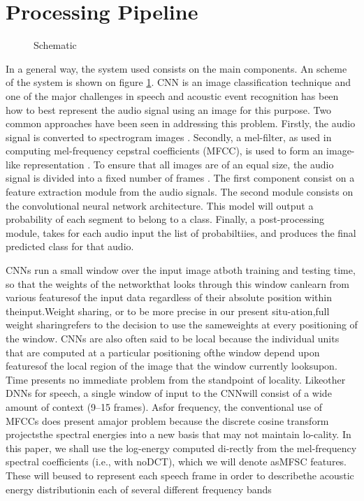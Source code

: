 
\section{Processing Pipeline}
\label{sec:processing_architecture}
\begin{figure}
\caption{Schematic}
\label{system_scheme}
\end{figure}

In a general way, the system used consists on the main components. An scheme of the system is shown on figure \ref{system_scheme}.  CNN is an image classification technique and one of the major challenges in speech and acoustic event recognition has been how to best represent the audio signal using an image for this purpose. Two common approaches have been seen in addressing this problem. Firstly, the audio signal is converted to spectrogram images \cite{zhang2015robust}. Secondly, a mel-filter, as used in computing mel-frequency cepstral coefficients (MFCC), is used to form an image-like representation \cite{abdel2014convolutional]}.  To ensure that all images are of an equal size, the audio signal is divided into a fixed number of frames \cite{We refer this as the mel-spectrogram.}. The first component consist on a feature extraction module  from the audio signals. The second module consists on the convolutional neural network architecture. This model will output a probability of each segment to belong to a class. Finally, a post-processing module, takes for each audio input the list of probabiltiies, and produces the final predicted class for that audio.

 



CNNs run a small window over the input image atboth training and testing time, so that the weights of the networkthat looks through this window canlearn from various featuresof the input data regardless of their absolute position within theinput.Weight sharing, or to be more precise in our present situ-ation,full weight sharingrefers to the decision to use the sameweights at every positioning of the window. CNNs are also often said to be local because the individual units that are computed at a particular positioning ofthe window depend upon featuresof the local region of the image that the window currently looksupon.
 Time presents no immediate problem from the standpoint of locality. Likeother DNNs for speech, a single window of input to the CNNwill consist of a wide amount of context (9–15 frames). Asfor frequency, the conventional use of MFCCs does present amajor problem because the discrete cosine transform projectsthe spectral energies into a new basis that may not maintain lo-cality. In this paper, we shall use the log-energy computed di-rectly from the mel-frequency spectral coefficients (i.e., with noDCT), which we will denote asMFSC features. These will beused to represent each speech frame in order to describethe acoustic energy distributionin each of several different frequency bands

